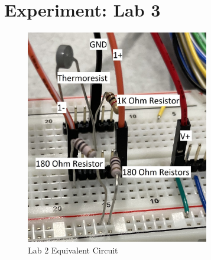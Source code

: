 \documentclass[12pt]{article}
\begin{document}
\section*{Experiment: Lab 3}
\begin{figure}[h]
\includegraphics[width=8cm]{Lab3 Circuit}
\centering
\caption{Lab 2 Equivalent Circuit}
\end{figure}
\end{document}
